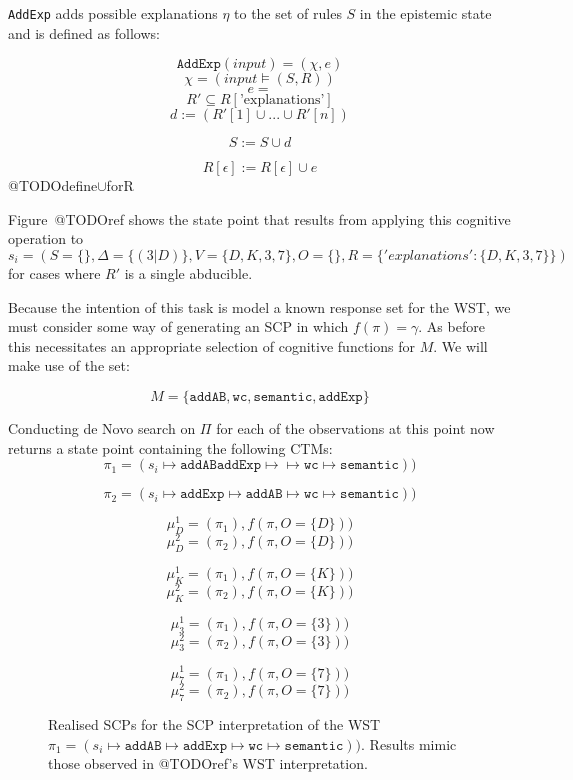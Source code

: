 \texttt{AddExp} adds possible explanations $\eta$ to the set of rules $S$ in the epistemic state and is defined as follows:

\[\texttt{AddExp}(\textit{input})=(\chi,e)\]
\[\chi=(\textit{input}\models (S,R))\]
\[e=\]
\[R'\subseteq R[\textrm{'explanations'}]\]
\[d := (R'[1]\cup...\cup R'[n])\]

\[S:=S\cup d\]

\[R[\epsilon]:=R[\epsilon] \cup e\]
@TODOdefine$\cup$forR

Figure~@TODOref shows the state point that results from applying this cognitive operation to $s_i=(S=\{\},\Delta=\{(3|D)\},V=\{D,K,3,7\},O=\{\},R=\{'explanations':\{D,K,3,7\}\})$ for cases where $R'$ is a single abducible.

Because the intention of this task is model a known response set for the WST, we must consider some way of generating an SCP in which $f(\pi)= \gamma$. As before this necessitates an appropriate selection of cognitive functions for $M$. We will make use of the set:

\[
M=\{\texttt{addAB},\texttt{wc},\texttt{semantic}, \texttt{addExp}\}
\]

Conducting de Novo search on $\Pi$ for each of the observations at this point now returns a state point containing the following CTMs:
\[
\pi_1=(s_i \longmapsto \texttt{addAB} \texttt{addExp} \longmapsto \longmapsto \texttt{wc} \longmapsto \texttt{semantic}))
\]

\[
\pi_2=(s_i \longmapsto \texttt{addExp} \longmapsto \texttt{addAB} \longmapsto \texttt{wc} \longmapsto \texttt{semantic}))
\]


\[
\mu_D^1=(\pi_1), f(\pi, O=\{D\}))
\]
\[
\mu_D^2=(\pi_2), f(\pi, O=\{D\}))
\]

\[
\mu_K^1=(\pi_1), f(\pi, O=\{K\}))
\]
\[
\mu_K^2=(\pi_2), f(\pi, O=\{K\}))
\]

\[
\mu_3^1=(\pi_1), f(\pi, O=\{3\}))
\]
\[
\mu_3^2=(\pi_2), f(\pi, O=\{3\}))
\]

\[
\mu_7^1=(\pi_1), f(\pi, O=\{7\}))
\]
\[
\mu_7^2=(\pi_2), f(\pi, O=\{7\}))
\]

\begin{figure}
\label{fig:rSCP_WST}
\caption{Realised SCPs for the SCP interpretation of the WST $\pi_1=(s_i \longmapsto \texttt{addAB} \longmapsto \texttt{addExp}  \longmapsto \texttt{wc} \longmapsto \texttt{semantic}))$. Results mimic those observed in @TODOref's WST interpretation.}
\end{figure}

